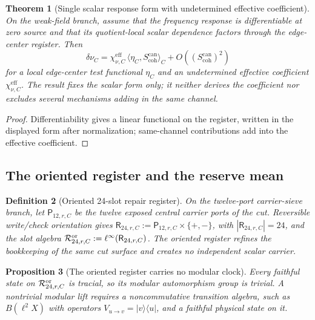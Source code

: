 \documentclass[11pt]{article}
\newtheorem{theorem}{Theorem}[section]
\newtheorem{definition}[theorem]{Definition}
\newtheorem{proposition}[theorem]{Proposition}
\theoremstyle{remark}
\theoremstyle{plain}
\begin{document}
\begin{theorem}[Single scalar response form with undetermined effective coefficient]
\label{thm:unique-scalar-linear-response}
On the weak-field branch, assume that the frequency response is
differentiable at zero source and that its quotient-local scalar dependence
factors through the edge-center register. Then
\[
\delta\nu_C=\chi_{\nu,C}^{\mathrm{eff}}\,
\langle\eta_C,S_{\mathrm{coh}}^{\mathrm{can}}\rangle_C
+O\!\left((S_{\mathrm{coh}}^{\mathrm{can}})^2\right)
\]
for a local edge-center test functional \(\eta_C\) and an undetermined
effective coefficient \(\chi_{\nu,C}^{\mathrm{eff}}\). The result fixes the
scalar form only; it neither derives the coefficient nor excludes several
mechanisms adding in the same channel.
\end{theorem}

\begin{proof}
Differentiability gives a linear functional on the register, written in the
displayed form after normalization; same-channel contributions add into the
effective coefficient.
\end{proof}

\subsection{The oriented register and the reserve mean}

\begin{definition}[Oriented 24-slot repair register]
\label{def:oriented-24-slot-register}
On the twelve-port carrier-sieve branch, let \(\mathsf P_{12,r,C}\) be the
twelve exposed central carrier ports of the cut. Reversible write/check
orientation gives \(\mathsf R_{24,r,C}:=\mathsf P_{12,r,C}\times\{+,-\}\),
with \(|\mathsf R_{24,r,C}|=24\), and the slot algebra
\(\mathcal R^{\rm or}_{24,r,C}:=\ell^\infty(\mathsf R_{24,r,C})\). The
oriented register refines the bookkeeping of the same cut surface and creates
no independent scalar carrier.
\end{definition}

\begin{proposition}[The oriented register carries no modular clock]
Every faithful state on \(\mathcal R^{\rm or}_{24,r,C}\) is tracial, so its
modular automorphism group is trivial. A nontrivial modular lift requires a
noncommutative transition algebra, such as \(B(\ell^2X)\) with operators
\(V_{u\to v}=|v\rangle\langle u|\), and a faithful physical state on it.
\end{proposition}
\end{document}
